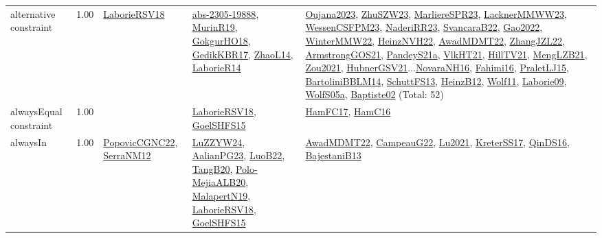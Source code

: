 {\begin{longtable}{p{3cm}r>{\raggedright\arraybackslash}p{6cm}>{\raggedright\arraybackslash}p{6cm}>{\raggedright\arraybackslash}p{8cm}}
\index{alternative constraint}\index{Constraints!alternative constraint}alternative constraint &  1.00 & \hyperref[detail:LaborieRSV18]{LaborieRSV18} & \hyperref[detail:abs-2305-19888]{abs-2305-19888}, \hyperref[detail:MurinR19]{MurinR19}, \hyperref[detail:GokgurHO18]{GokgurHO18}, \hyperref[detail:GedikKBR17]{GedikKBR17}, \hyperref[detail:ZhaoL14]{ZhaoL14}, \hyperref[detail:LaborieR14]{LaborieR14} & \hyperref[detail:Oujana2023]{Oujana2023}, \hyperref[detail:ZhuSZW23]{ZhuSZW23}, \hyperref[detail:MarliereSPR23]{MarliereSPR23}, \hyperref[detail:LacknerMMWW23]{LacknerMMWW23}, \hyperref[detail:WessenCSFPM23]{WessenCSFPM23}, \hyperref[detail:NaderiRR23]{NaderiRR23}, \hyperref[detail:SvancaraB22]{SvancaraB22}, \hyperref[detail:Gao2022]{Gao2022}, \hyperref[detail:WinterMMW22]{WinterMMW22}, \hyperref[detail:HeinzNVH22]{HeinzNVH22}, \hyperref[detail:AwadMDMT22]{AwadMDMT22}, \hyperref[detail:ZhangJZL22]{ZhangJZL22}, \hyperref[detail:ArmstrongGOS21]{ArmstrongGOS21}, \hyperref[detail:PandeyS21a]{PandeyS21a}, \hyperref[detail:VlkHT21]{VlkHT21}, \hyperref[detail:HillTV21]{HillTV21}, \hyperref[detail:MengLZB21]{MengLZB21}, \hyperref[detail:Zou2021]{Zou2021}, \hyperref[detail:HubnerGSV21]{HubnerGSV21}...\hyperref[detail:NovaraNH16]{NovaraNH16}, \hyperref[detail:Fahimi16]{Fahimi16}, \hyperref[detail:PraletLJ15]{PraletLJ15}, \hyperref[detail:BartoliniBBLM14]{BartoliniBBLM14}, \hyperref[detail:SchuttFS13]{SchuttFS13}, \hyperref[detail:HeinzB12]{HeinzB12}, \hyperref[detail:Wolf11]{Wolf11}, \hyperref[detail:Laborie09]{Laborie09}, \hyperref[detail:WolfS05a]{WolfS05a}, \hyperref[detail:Baptiste02]{Baptiste02} (Total: 52)\\
\index{alwaysEqual constraint}\index{Constraints!alwaysEqual constraint}alwaysEqual constraint &  1.00 &  & \hyperref[detail:LaborieRSV18]{LaborieRSV18}, \hyperref[detail:GoelSHFS15]{GoelSHFS15} & \hyperref[detail:HamFC17]{HamFC17}, \hyperref[detail:HamC16]{HamC16}\\
\index{alwaysIn}\index{Constraints!alwaysIn}alwaysIn &  1.00 & \hyperref[detail:PopovicCGNC22]{PopovicCGNC22}, \hyperref[detail:SerraNM12]{SerraNM12} & \hyperref[detail:LuZZYW24]{LuZZYW24}, \hyperref[detail:AalianPG23]{AalianPG23}, \hyperref[detail:LuoB22]{LuoB22}, \hyperref[detail:TangB20]{TangB20}, \hyperref[detail:Polo-MejiaALB20]{Polo-MejiaALB20}, \hyperref[detail:MalapertN19]{MalapertN19}, \hyperref[detail:LaborieRSV18]{LaborieRSV18}, \hyperref[detail:GoelSHFS15]{GoelSHFS15} & \hyperref[detail:AwadMDMT22]{AwadMDMT22}, \hyperref[detail:CampeauG22]{CampeauG22}, \hyperref[detail:Lu2021]{Lu2021}, \hyperref[detail:KreterSS17]{KreterSS17}, \hyperref[detail:QinDS16]{QinDS16}, \hyperref[detail:BajestaniB13]{BajestaniB13}\\

\end{longtable}}
